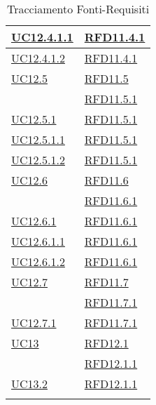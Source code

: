 \begin{longtable}{|>{\centering}m{5cm}|m{5cm}<{\centering}|}
\hyperref[UC12.4.1.1]{UC12.4.1.1} & \hyperlink{RFD11.4.1}{RFD11.4.1}\\ \hline
\hyperref[UC12.4.1.2]{UC12.4.1.2} & \hyperlink{RFD11.4.1}{RFD11.4.1}\\ \hline
\hyperref[UC12.5]{UC12.5} & \hyperlink{RFD11.5}{RFD11.5}\\
& \hyperlink{RFD11.5.1}{RFD11.5.1}\\ \hline
\hyperref[UC12.5.1]{UC12.5.1} & \hyperlink{RFD11.5.1}{RFD11.5.1}\\ \hline
\hyperref[UC12.5.1.1]{UC12.5.1.1} & \hyperlink{RFD11.5.1}{RFD11.5.1}\\ \hline
\hyperref[UC12.5.1.2]{UC12.5.1.2} & \hyperlink{RFD11.5.1}{RFD11.5.1}\\ \hline
\hyperref[UC12.6]{UC12.6} & \hyperlink{RFD11.6}{RFD11.6}\\
& \hyperlink{RFD11.6.1}{RFD11.6.1}\\ \hline
\hyperref[UC12.6.1]{UC12.6.1} & \hyperlink{RFD11.6.1}{RFD11.6.1}\\ \hline
\hyperref[UC12.6.1.1]{UC12.6.1.1} & \hyperlink{RFD11.6.1}{RFD11.6.1}\\ \hline
\hyperref[UC12.6.1.2]{UC12.6.1.2} & \hyperlink{RFD11.6.1}{RFD11.6.1}\\ \hline
\hyperref[UC12.7]{UC12.7} & \hyperlink{RFD11.7}{RFD11.7}\\
& \hyperlink{RFD11.7.1}{RFD11.7.1}\\ \hline
\hyperref[UC12.7.1]{UC12.7.1} & \hyperlink{RFD11.7.1}{RFD11.7.1}\\ \hline
\hyperref[UC13]{UC13} & \hyperlink{RFD12.1}{RFD12.1}\\
& \hyperlink{RFD12.1.1}{RFD12.1.1}\\ \hline
\hyperref[UC13.2]{UC13.2} & \hyperlink{RFD12.1.1}{RFD12.1.1}\\ \hline
\caption[Tracciamento Fonti-Requisiti]{Tracciamento Fonti-Requisiti}
\label{tabella:fonti-requi}
\end{longtable}
\clearpage
